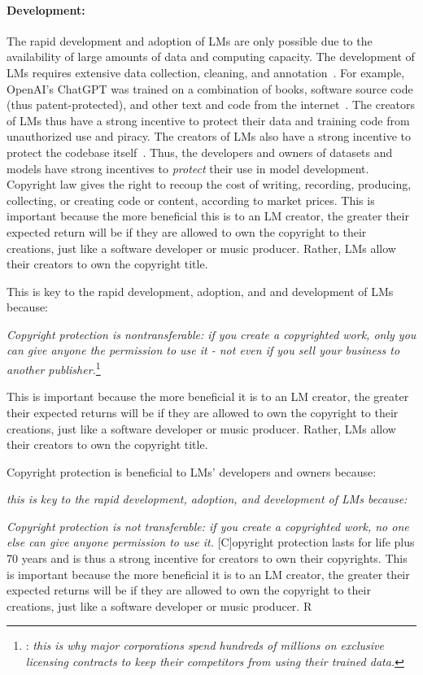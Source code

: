 {{\paragraph{Development:}  The rapid development and adoption of LMs are only possible due to the availability of large amounts of data and computing capacity.
The development of LMs requires extensive data collection, cleaning, and annotation~\citep{neurips1, dodge-etal-2021-documenting}.
For example, OpenAI's ChatGPT was trained on a combination of books, software source code (thus patent-protected), and other text and code from the internet~\citep{langley00}.
The creators of LMs thus have a strong incentive to protect their data and training code from unauthorized use and piracy.
The creators of LMs also have a strong incentive to protect the codebase itself~\citep{henderson2023foundation, lemley2020fair}.
Thus, the developers and owners of datasets and models have strong incentives to \emph{protect} their use in model development.
Copyright law gives the right to recoup the cost of writing, recording, producing, collecting, or creating code or content, according to market prices.
This is important because the more beneficial this is to an LM creator, the greater their expected return will be if they are allowed to own the copyright to their creations, just like a software developer or music producer.
Rather, LMs allow their creators to own the copyright title.

This is key to the rapid development, adoption, and and development of LMs because:
\begin{myquotation}
    \emph{ Copyright protection is nontransferable: if you create a copyrighted work, only you can give anyone the permission to use it - not even if you sell your business to another publisher.}\footnote{\citet{carlini2023extracting}: \emph{this is why major corporations spend hundreds of millions on exclusive licensing contracts to keep their competitors from using their trained data.}
}
\end{myquotation}

This is important because the more beneficial it is to an LM creator, the greater their expected returns will be if they are allowed to own the copyright to their creations, just like a software developer or music producer.
Rather, LMs allow their creators to own the copyright title.

Copyright protection is beneficial to LMs' developers and owners because:
\begin{myquotation}
    \emph{this is key to the rapid development, adoption, and development of LMs because:}
    \item \emph{Copyright protection is not transferable: if you create a copyrighted work, no one else can give anyone permission to use it.} [C]opyright protection lasts for life plus 70 years and is thus a strong incentive for creators to own their copyrights. This is important because the more beneficial it is to an LM creator, the greater their expected returns will be if they are allowed to own the copyright to their creations, just like a software developer or music producer. R
\end{myquotation}

}}
